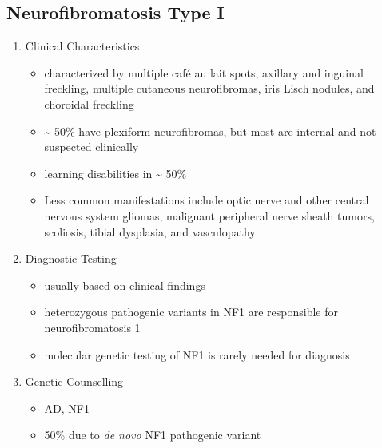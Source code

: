 \documentclass[12pt]{scrartcl}
\begin{document}
\subsection{Neurofibromatosis Type I}
\label{sec:org0a6d196}
\begin{enumerate}
\item Clinical Characteristics
\label{sec:org4be6dcc}
\begin{itemize}
\item characterized by multiple café au lait spots, axillary and inguinal freckling, multiple cutaneous neurofibromas, iris Lisch nodules, and choroidal freckling
\item \textasciitilde{} 50\% have plexiform neurofibromas, but most are internal and not suspected clinically
\item learning disabilities in \textasciitilde{} 50\%
\item Less common manifestations include optic nerve and other central
nervous system gliomas, malignant peripheral nerve sheath tumors,
scoliosis, tibial dysplasia, and vasculopathy
\end{itemize}
\item Diagnostic Testing
\label{sec:org1c61b5a}
\begin{itemize}
\item usually based on clinical findings
\item heterozygous pathogenic variants in NF1 are responsible for neurofibromatosis 1
\item molecular genetic testing of NF1 is rarely needed for diagnosis
\end{itemize}
\item Genetic Counselling
\label{sec:orgeb86001}
\begin{itemize}
\item AD, NF1
\item 50\% due to \emph{de novo} NF1 pathogenic variant
\end{itemize}
\end{enumerate}
\end{document}
